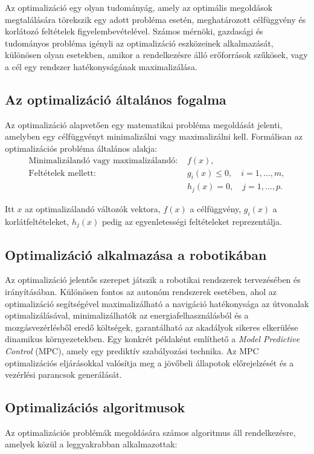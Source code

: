 Az optimalizáció egy olyan tudományág, amely az optimális megoldások megtalálására törekszik egy adott probléma esetén, meghatározott célfüggvény és korlátozó feltételek figyelembevételével. Számos mérnöki, gazdasági és tudományos probléma igényli az optimalizáció eszközeinek alkalmazását, különösen olyan esetekben, amikor a rendelkezésre álló erőforrások szűkösek, vagy a cél egy rendszer hatékonyságának maximalizálása.

\subsection{Az optimalizáció általános fogalma}
Az optimalizáció alapvetően egy matematikai probléma megoldását jelenti, amelyben egy célfüggvényt minimalizálni vagy maximalizálni kell. Formálisan az optimalizációs probléma általános alakja:
\begin{align}
    \text{Minimalizálandó vagy maximalizálandó: } & f(x), \\
    \text{Feltételek mellett: } & g_i(x) \leq 0, \quad i = 1, \dots, m, \\
    & h_j(x) = 0, \quad j = 1, \dots, p.
\end{align}

Itt $x$ az optimalizálandó változók vektora, $f(x)$ a célfüggvény, $g_i(x)$ a korlátfeltételeket, $h_j(x)$ pedig az egyenletességi feltételeket reprezentálja.

\subsection{Optimalizáció alkalmazása a robotikában}
Az optimalizáció jelentős szerepet játszik a robotikai rendszerek tervezésében és irányításában. Különösen fontos az autonóm rendszerek esetében, ahol az optimalizáció segítségével maximalizálható a navigáció hatékonysága az útvonalak optimalizálásával, minimalizálhatók az energiafelhasználásból és a mozgásvezérlésből eredő költségek, garantálható az akadályok sikeres elkerülése dinamikus környezetekben. Egy konkrét példaként említhető a \textit{Model Predictive Control} (MPC), amely egy prediktív szabályozási technika. Az MPC optimalizációs eljárásokkal valósítja meg a jövőbeli állapotok előrejelzését és a vezérlési parancsok generálását.

\subsection{Optimalizációs algoritmusok}
Az optimalizációs problémák megoldására számos algoritmus áll rendelkezésre, amelyek közül a leggyakrabban alkalmazottak:

